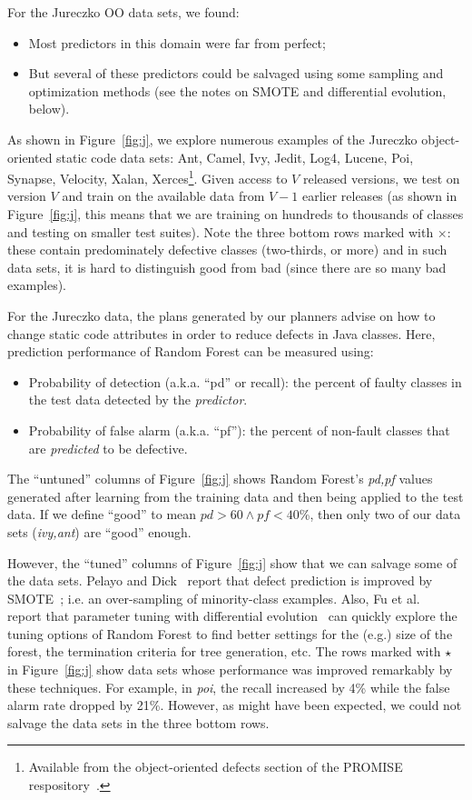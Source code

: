 \documentclass{sig-alternate}
\newcommand{\bi}{\begin{itemize}}
\newcommand{\ei}{\end{itemize}}
\newcommand{\fig}[1]{Figure~\ref{fig:#1}}
\begin{document}
For the Jureczko OO data sets, we found:
\bi
\item
Most predictors in this domain were far from perfect;
\item 
But several of these predictors could
be salvaged using some sampling and optimization methods (see the notes on SMOTE and differential evolution, below).
\ei
As shown in \fig{j}, we   explore numerous examples of the Jureczko   object-oriented static code data sets: Ant, Camel, Ivy, Jedit,   Log4, Lucene, Poi, Synapse, Velocity, Xalan, Xerces\footnote{Available from the object-oriented defects section of the PROMISE respository~\cite{promiserepo}.}. 
Given access to $V$ released
versions, we test on version $V$ and train on the available data from $V-1$ earlier releases (as
shown in \fig{j}, this means that we are training on hundreds to thousands
of classes and testing on smaller test suites).
Note the three bottom rows marked with $\times$: these contain predominately
defective classes (two-thirds, or more) and in such data sets, it is hard to distinguish
good from bad (since there are so many bad examples). 

For the  Jureczko   data,
the plans generated by our planners advise on  how to change static code attributes in order to reduce defects in Java classes. Here, prediction performance of Random Forest can be measured using:
\bi
\item Probability of detection (a.k.a. ``pd'' or recall):  the percent of faulty classes in
the test data detected
by the {\em predictor}.
\item Probability of false alarm (a.k.a. ``pf''): the percent of non-fault
classes that are {\em predicted} to be defective.
\ei 

The ``untuned'' columns of \fig{j} shows Random Forest's {\em pd,pf}
values generated after learning from the training data and then being applied to the test data.
If we define ``good'' to mean $\mathit{pd}>60 \wedge \mathit{pf} < 40$\%,
then only two of our data sets ({\em ivy,ant}) are ``good'' enough. 

However, the ``tuned'' columns of \fig{j} show that we can salvage some of the data sets. Pelayo and Dick~\cite{pelayo07} report that defect prediction is improved by SMOTE~\cite{Chawla2002}; i.e. an over-sampling of minority-class examples. Also, Fu et al.~\cite{fu:fse16} report that parameter tuning with differential evolution~\cite{storn97} can quickly explore the tuning options of Random Forest to find better settings for the (e.g.) size of the forest, the termination criteria
for tree generation, etc. The rows marked with $\star$ in \fig{j} show data sets whose performance was improved remarkably by these techniques. For example, in {\em poi}, the recall increased by 4\% while the false alarm rate dropped by 21\%. However,  as might have been expected, we could not salvage the data sets in the  three bottom rows.
\end{document}
